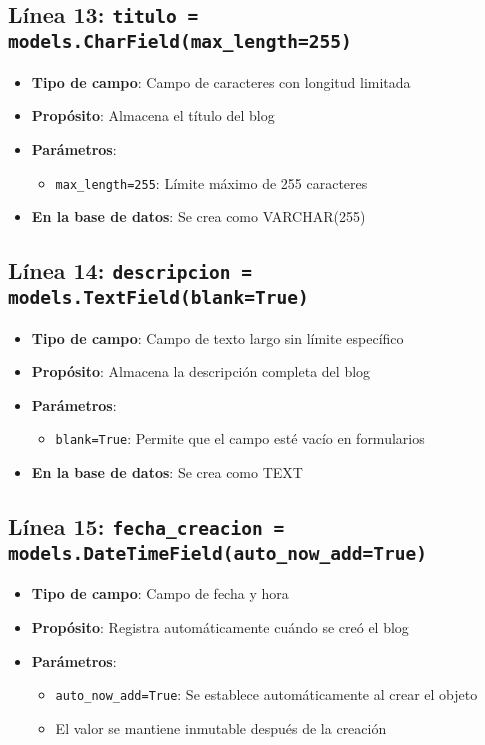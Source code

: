 \documentclass[12pt,a4paper]{article}
\begin{document}
	\subsection{Línea 13: \texttt{titulo = models.CharField(max\_length=255)}}
	\begin{itemize}
		\item \textbf{Tipo de campo}: Campo de caracteres con longitud limitada
		\item \textbf{Propósito}: Almacena el título del blog
		\item \textbf{Parámetros}:
		\begin{itemize}
			\item \texttt{max\_length=255}: Límite máximo de 255 caracteres
		\end{itemize}
		\item \textbf{En la base de datos}: Se crea como VARCHAR(255)
	\end{itemize}
	
	\subsection{Línea 14: \texttt{descripcion = models.TextField(blank=True)}}
	\begin{itemize}
		\item \textbf{Tipo de campo}: Campo de texto largo sin límite específico
		\item \textbf{Propósito}: Almacena la descripción completa del blog
		\item \textbf{Parámetros}:
		\begin{itemize}
			\item \texttt{blank=True}: Permite que el campo esté vacío en formularios
		\end{itemize}
		\item \textbf{En la base de datos}: Se crea como TEXT
	\end{itemize}
	
	\subsection{Línea 15: \texttt{fecha\_creacion = models.DateTimeField(auto\_now\_add=True)}}
	\begin{itemize}
		\item \textbf{Tipo de campo}: Campo de fecha y hora
		\item \textbf{Propósito}: Registra automáticamente cuándo se creó el blog
		\item \textbf{Parámetros}:
		\begin{itemize}
			\item \texttt{auto\_now\_add=True}: Se establece automáticamente al crear el objeto
			\item El valor se mantiene inmutable después de la creación
		\end{itemize}
	\end{itemize}
	
\end{document}
